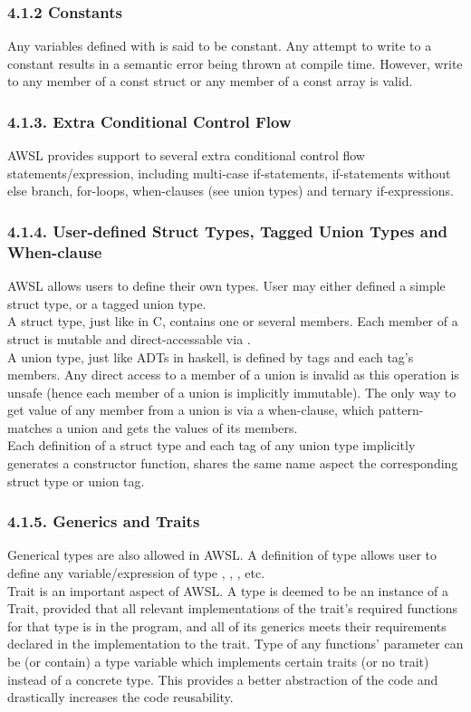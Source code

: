 \documentclass[10pt,a4paper]{report}
\begin{document}
  \subsubsection*{4.1.2 Constants}
  Any variables defined with  is said to be constant. Any attempt to write to a constant results in a semantic error being thrown at compile time.
  However, write to any member of a const struct or any member of a const array is valid. 

  \subsubsection*{4.1.3. Extra Conditional Control Flow}
  AWSL provides support to several extra conditional control flow statements/expression, including multi-case if-statements, if-statements
  without else branch, for-loops, when-clauses (see union types) and ternary if-expressions. 

  \subsubsection*{4.1.4. User-defined Struct Types, Tagged Union Types and When-clause}
  AWSL allows users to define their own types. User may either defined a simple struct type, or a tagged union type.\\
  A struct type, just like  in C, contains one or several members. Each member of a struct is mutable and
  direct-accessable via .\\
  A union type, just like ADTs in haskell, is defined by tags and each tag's members. Any direct access to a member of a union is
  invalid as this operation is unsafe (hence each member of a union is implicitly immutable). The only way to get value of any member
  from a union is via a when-clause, which pattern-matches a union and gets the values of its members.\\
  Each definition of a struct type and each tag of any union type implicitly generates a constructor function, shares the same name aspect
  the corresponding struct type or union tag.

  \subsubsection*{4.1.5. Generics and Traits}
  Generical types are also allowed in AWSL. A definition of type  allows user to define any variable/expression 
  of type , , , etc.\\
  Trait is an important aspect of AWSL. A type is deemed to be an instance of a Trait, provided that all relevant implementations of
  the trait's required functions for that type is in the program, and all of its generics meets their requirements declared
  in the implementation to the trait. Type of any functions' parameter can be (or contain) a type variable 
  which implements certain traits (or no trait) instead of a concrete type. This provides a better abstraction of the code and 
  drastically increases the code reusability. 
\end{document}
